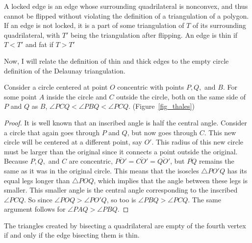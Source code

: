 \begin{definition}
	A locked edge is an edge whose surrounding quadrilateral is nonconvex, and thus cannot be flipped without violating the definition of a triangulation of a polygon.
	If an edge is not locked, it is a part of some triangulation of $T$ of its surrounding quadrilateral, with $T'$ being the triangulation after flipping.
	An edge is thin if $T<T'$ and fat if $T>T'$
\end{definition}

Now, I will relate the definition of thin and thick edges to the empty circle definition of the Delaunay triangulation.

\begin{lemma}[Thales']
	Consider a circle centered at point $O$ concentric with points $P, Q,$ and $B$.
	For some point $A$ inside the circle and $C$ outside the circle, both on the same side of $P$ and $Q$ as $B$, $\angle PCQ < \angle PBQ < \angle PCQ $.
	(Figure~\ref{fig_thales})
\end{lemma}



\begin{proof}
	It is well known that an inscribed angle is half the central angle. Consider a circle that again goes through $P$ and $Q$, but now goes through $C$.
	This new circle will be centered at a different point, say $O'$.
	This radius of this new circle must be larger than the original since it connects a point outside the original.
	Because $P, Q,$ and $C$ are concentric, $\overline{PO'}=\overline{CO'}=\overline{QO'}$, but $\overline{PQ}$ remains the same as it was in the original circle.
	This means that the isoscles $\triangle PO'Q$ has its equal legs longer than $\triangle POQ$, which implies that the angle between these legs is smaller.
	This smaller angle is the central angle corresponding to the inscribed $\angle PCQ$.
	So since $\angle POQ > \angle PO'Q$, so too is $\angle PBQ > \angle PCQ$.
	The same argument follows for $\angle PAQ > \angle PBQ$.
\end{proof}

\begin{lemma}\label{lem_thin_fat}
	The triangles created by bisecting a quadrilateral are empty of the fourth vertex if and only if the edge bisecting them is thin.
\end{lemma}


